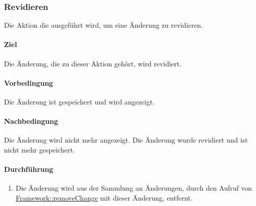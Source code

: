 \newpage
\subsubsection{Revidieren}\label{AP_Aktionen_Anderungen_Revidieren}

Die Aktion die ausgeführt wird, um eine Änderung zu revidieren.

\paragraph*{Ziel}
Die Änderung, die zu dieser Aktion gehört, wird revidiert.

\paragraph*{Vorbedingung}
Die Änderung ist gespeichert und wird angezeigt.

\paragraph*{Nachbedingung}
Die Änderung wird nicht mehr angezeigt. Die Änderung wurde revidiert und ist nicht mehr gespeichert.

\paragraph*{Durchführung}
\begin{enumerate}
    \item Die Änderung wird aus der Sammlung an Änderungen, durch den Aufruf von \hyperref[AP_Framework_removeChange]{Framework::removeChange} mit dieser Änderung, entfernt.
\end{enumerate}